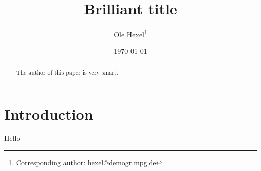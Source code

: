 \documentclass[12pt, english]{article}
\begin{document}
                   
	
\date{\today}
\title{Brilliant title}
\author[1]{Ole Hexel\thanks{Corresponding author: hexel@demogr.mpg.de}}

\maketitle

\begin{abstract}
    The author of this paper is very smart.
\end{abstract}

\section{Introduction}
Hello



\printbibliography
% 

\clearpage
\appendix
\end{document}
